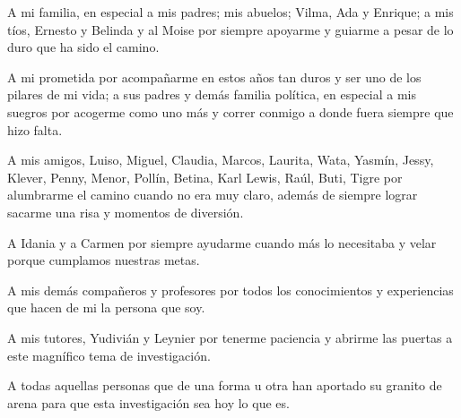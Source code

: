 \begin{acknowledgements}
	A mi familia, en especial a mis padres; mis abuelos; Vilma, Ada y Enrique; a mis tíos, Ernesto y Belinda y al Moise por siempre apoyarme y guiarme a pesar de lo duro que ha sido el camino.\vspace{10 pt}
	
	
	A mi prometida por acompañarme en estos años tan duros y ser uno de los pilares de mi vida; a sus padres y demás familia política, en especial a mis suegros por acogerme como uno más y correr conmigo a donde fuera siempre que hizo falta.\vspace{10 pt}
	
	
	A mis amigos, Luiso, Miguel, Claudia, Marcos, Laurita, Wata, Yasmín, Jessy, Klever, Penny, Menor, Pollín, Betina, Karl Lewis, Raúl, Buti, Tigre por alumbrarme el camino cuando no era muy claro, además de siempre lograr sacarme una risa y momentos de diversión.\vspace{10 pt}
	
	
	A Idania y a Carmen por siempre ayudarme cuando más lo necesitaba y velar porque cumplamos nuestras metas.\vspace{10 pt}
	
	
	A mis demás compañeros y profesores por todos los conocimientos y experiencias que hacen de mi la persona que soy.\vspace{10 pt}
	
	
	A mis tutores, Yudivián y Leynier por tenerme paciencia y abrirme las puertas a este magnífico tema de investigación.\vspace{10 pt}
	
	
	A todas aquellas personas que de una forma u otra han aportado su granito de arena para que esta investigación sea hoy lo que es.
\end{acknowledgements}